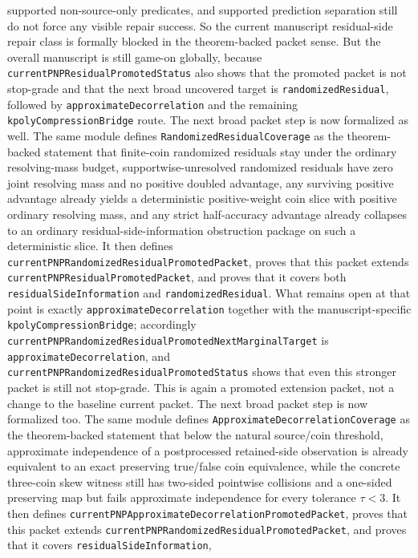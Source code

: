\documentclass[11pt]{article}
\theoremstyle{remark}
\begin{document}
supported non-source-only predicates, and supported prediction separation
still do not force any visible repair success.  So the current manuscript
residual-side repair class is formally blocked in the theorem-backed packet
sense.  But the overall manuscript is still game-on globally, because
\texttt{currentPNPResidualPromotedStatus} also shows that the promoted packet
is not stop-grade and that the next broad uncovered target is
\texttt{randomizedResidual}, followed by
\texttt{approximateDecorrelation} and the remaining
\texttt{kpolyCompressionBridge} route.
The next broad packet step is now formalized as well.  The same module defines
\texttt{RandomizedResidualCoverage} as the theorem-backed statement that
finite-coin randomized residuals stay under the ordinary resolving-mass budget,
supportwise-unresolved randomized residuals have zero joint resolving mass and
no positive doubled advantage, any surviving positive advantage already yields a
deterministic positive-weight coin slice with positive ordinary resolving mass,
and any strict half-accuracy advantage already collapses to an ordinary
residual-side-information obstruction package on such a deterministic slice.
It then defines \texttt{currentPNPRandomizedResidualPromotedPacket}, proves that
this packet extends \texttt{currentPNPResidualPromotedPacket}, and proves that
it covers both \texttt{residualSideInformation} and
\texttt{randomizedResidual}.  What remains open at that point is exactly
\texttt{approximateDecorrelation} together with the manuscript-specific
\texttt{kpolyCompressionBridge}; accordingly
\texttt{currentPNPRandomizedResidualPromotedNextMarginalTarget} is
\texttt{approximateDecorrelation}, and
\texttt{currentPNPRandomizedResidualPromotedStatus} shows that even this
stronger packet is still not stop-grade.  This is again a promoted extension
packet, not a change to the baseline current packet.
The next broad packet step is now formalized too.  The same module defines
\texttt{ApproximateDecorrelationCoverage} as the theorem-backed statement that
below the natural source/coin threshold, approximate independence of a
postprocessed retained-side observation is already equivalent to an exact
preserving true/false coin equivalence, while the concrete three-coin skew
witness still has two-sided pointwise collisions and a one-sided preserving map
but fails approximate independence for every tolerance \(\tau<3\).  It then
defines \texttt{currentPNPApproximateDecorrelationPromotedPacket}, proves that
this packet extends \texttt{currentPNPRandomizedResidualPromotedPacket}, and
proves that it covers \texttt{residualSideInformation},
\end{document}
